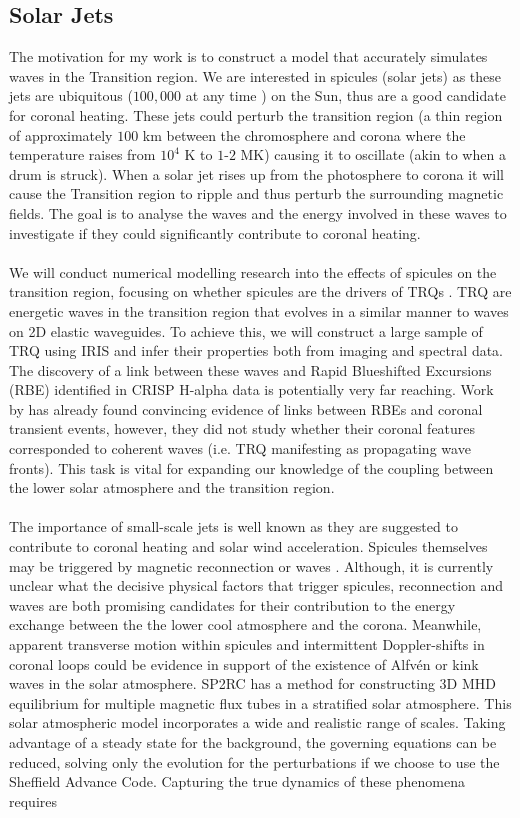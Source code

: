 \documentclass[12pt,a4paper,twoside]{article}
\newcommand{\Alfven}{Alfv\'{e}n }
\begin{document}
\subsection{Solar Jets}
The motivation for my work is to construct a model that accurately simulates waves in the Transition region. We are interested in spicules (solar jets) as these jets are ubiquitous ($100,000$  at  any  time \citep{Beckers1968}) on the Sun, thus are a good candidate for coronal heating. These jets could perturb the transition region (a thin region of approximately $100$ km between the chromosphere and corona where the temperature raises from $10^4$ K to $1$-$2$ MK) causing it to oscillate (akin to when a drum is struck). When a solar jet rises up from the photosphere to corona it will cause the Transition region to ripple and thus perturb the surrounding magnetic fields. The goal is to analyse the waves and the energy involved in these waves to investigate if they could significantly contribute to coronal heating. \\ \\ We will conduct numerical modelling research into the effects of spicules on the transition region, focusing on whether spicules are the drivers of TRQs \citep{Scullion2011}. TRQ are energetic waves in the transition region that evolves in a similar manner to waves on 2D elastic waveguides. To achieve this, we will construct a large sample of TRQ using IRIS and infer their properties both from imaging and spectral data. The discovery of a link between these waves and Rapid Blueshifted Excursions (RBE) identified in CRISP H-alpha data is potentially very far reaching. Work by \cite{Henriques2016} has already found convincing evidence of links between RBEs and coronal transient events, however, they did not study whether their coronal features corresponded to coherent waves (i.e. TRQ manifesting as propagating wave fronts). This task is vital for expanding our knowledge of the coupling between the lower solar atmosphere and the transition region. \\ \\ The importance of small-scale jets is well known as they are suggested to contribute to coronal heating and solar wind acceleration. Spicules themselves may be triggered by magnetic reconnection \citep{Pontieu2007} or waves \citep{DePontieu2004}. Although, it is currently unclear what the decisive physical factors that trigger spicules, reconnection and waves are both promising candidates for their contribution to the energy exchange between the the lower cool atmosphere and the corona. Meanwhile, apparent transverse motion within spicules and intermittent Doppler-shifts in coronal loops could be evidence in support of the existence of \Alfven or kink waves in the solar atmosphere. SP2RC has a method for constructing 3D MHD equilibrium for multiple magnetic flux tubes in a stratified solar atmosphere. This solar atmospheric model incorporates a wide and realistic range of scales. Taking advantage of a steady state for the background, the governing equations can be reduced, solving only the evolution for the perturbations if we choose to use the Sheffield Advance Code. Capturing the true dynamics of these phenomena requires 
\end{document}
